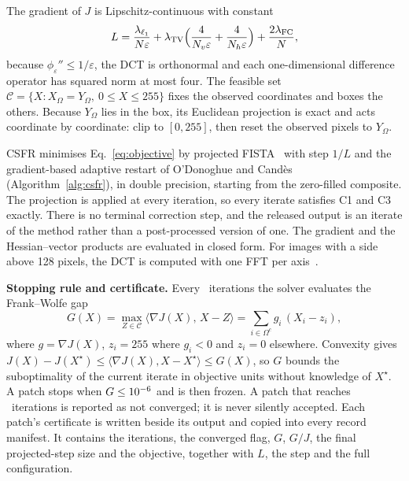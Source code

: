 \documentclass[final,3p]{elsarticle}
\begin{document}
The gradient of $J$ is Lipschitz-continuous with constant
\begin{equation}
\label{eq:lipschitz}
L = \frac{\lambda_{\ell_1}}{N\varepsilon} + \lambda_{\mathrm{TV}} \Bigl( \frac{4}{N_{v}\varepsilon} + \frac{4}{N_{h}\varepsilon} \Bigr) + \frac{2\lambda_{\mathrm{FC}}}{N},
\end{equation}
because $\phi_{\varepsilon}'' \le 1/\varepsilon$, the DCT is orthonormal and each one-dimensional difference operator has squared norm at most four. The feasible set $\mathcal{C} = \{X : X_{\Omega} = Y_{\Omega},\ 0 \le X \le 255\}$ fixes the observed coordinates and boxes the others. Because $Y_{\Omega}$ lies in the box, its Euclidean projection is exact and acts coordinate by coordinate: clip to $[0,255]$, then reset the observed pixels to $Y_{\Omega}$.

CSFR minimises Eq.~\eqref{eq:objective} by projected FISTA~\cite{beck2009fast} with step $1/L$ and the gradient-based adaptive restart of O'Donoghue and Cand\`{e}s~\cite{odonoghue2015adaptive} (Algorithm~\ref{alg:csfr}), in double precision, starting from the zero-filled composite. The projection is applied at every iteration, so every iterate satisfies C1 and C3 exactly. There is no terminal correction step, and the released output is an iterate of the method rather than a post-processed version of one. The gradient and the Hessian--vector products are evaluated in closed form. For images with a side above 128 pixels, the DCT is computed with one FFT per axis~\cite{makhoul1980fast}.

\textbf{Stopping rule and certificate.} Every \csfrCheckEvery\ iterations the solver evaluates the Frank--Wolfe gap~\cite{frank1956algorithm}
\begin{equation}
\label{eq:gap}
G(X) = \max_{Z \in \mathcal{C}} \langle \nabla J(X),\, X - Z \rangle = \sum_{i \in \Omega^{c}} g_{i}\,(X_{i} - z_{i}),
\end{equation}
where $g = \nabla J(X)$, $z_{i} = 255$ where $g_{i} < 0$ and $z_{i} = 0$ elsewhere. Convexity gives $J(X) - J(X^{\star}) \le \langle \nabla J(X), X - X^{\star} \rangle \le G(X)$, so $G$ bounds the suboptimality of the current iterate in objective units without knowledge of $X^{\star}$. A patch stops when $G \le 10^{-6}$ and is then frozen. A patch that reaches \csfrMaxIter\ iterations is reported as not converged; it is never silently accepted. Each patch's certificate is written beside its output and copied into every record manifest. It contains the iterations, the converged flag, $G$, $G/J$, the final projected-step size and the objective, together with $L$, the step and the full configuration.
\end{document}
